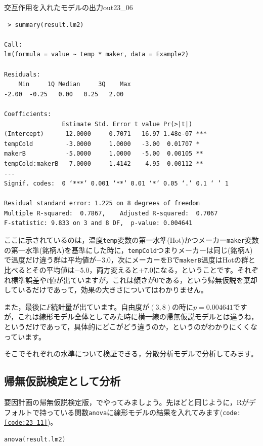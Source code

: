 \documentclass{ltjbook}
\begin{document}
\begin{Rscreen}{交互作用を入れたモデルの出力}{out23_06}
	\begin{verbatim}
 > summary(result.lm2)

Call:
lm(formula = value ~ temp * maker, data = Example2)
 
Residuals:
    Min     1Q Median     3Q    Max 
-2.00  -0.25   0.00   0.25   2.00 

Coefficients:
                Estimate Std. Error t value Pr(>|t|)    
(Intercept)      12.0000     0.7071   16.97 1.48e-07 ***
tempCold         -3.0000     1.0000   -3.00  0.01707 *  
makerB           -5.0000     1.0000   -5.00  0.00105 ** 
tempCold:makerB   7.0000     1.4142    4.95  0.00112 ** 
---
Signif. codes:  0 ‘***’ 0.001 ‘**’ 0.01 ‘*’ 0.05 ‘.’ 0.1 ‘ ’ 1

Residual standard error: 1.225 on 8 degrees of freedom
Multiple R-squared:  0.7867,	Adjusted R-squared:  0.7067 
F-statistic: 9.833 on 3 and 8 DF,  p-value: 0.004641
\end{verbatim}
\end{Rscreen}
ここに示されているのは，温度\texttt{temp}変数の第一水準(Hot)かつメーカー\texttt{maker}変数の第一水準(銘柄A)を基準にした時に，\texttt{tempCold}つまりメーカーは同じ(銘柄A)で温度だけ違う群は平均値が$-3.0$，次にメーカーをBで\texttt{makerB}温度はHotの群と比べるとその平均値は$-5.0$，両方変えると$+7.0$になる，ということです。それぞれ標準誤差や$t$値が出ていますが，これは傾きが0である，という帰無仮説を棄却しているだけであって，効果の大きさについてはわかりません。

また，最後に$F$統計量が出ています。自由度が$(3,8)$の時に$p=0.004641$ですが，これは線形モデル全体としてみた時に横一線の帰無仮説モデルとは違うね，というだけであって，具体的にどこがどう違うのか，というのがわかりにくくなっています。

そこでそれぞれの水準について検証できる，分散分析モデルで分析してみます。
\subsection{帰無仮説検定として分析}
要因計画の帰無仮説検定版，でやってみましょう。先ほどと同じように，Rがデフォルトで持っている関数\texttt{anova}に線形モデルの結果を入れてみます(\texttt{code:\ref{code:23_11}})。
\begin{lstlisting}[language=c++,label={code:23_11},caption={分散分析としてみる}]
anova(result.lm2)
\end{lstlisting}
\end{document}
